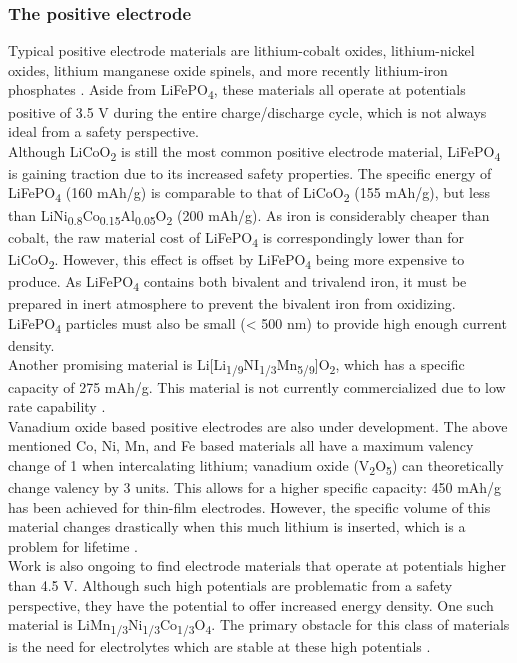\documentclass[12pt]{article} %
\begin{document}
\subsubsection{The positive electrode} %

Typical positive electrode materials are lithium-cobalt oxides, lithium-nickel oxides, lithium manganese oxide spinels, and more recently lithium-iron phosphates \cite{kulova_new_2013}.
Aside from LiFePO\textsubscript{4}, these materials all operate at potentials positive of 3.5 V during the entire charge/discharge cycle, which is not always ideal from a safety perspective.
\\
Although LiCoO\textsubscript{2} is still the most common positive electrode material, LiFePO\textsubscript{4} is gaining traction due to its increased safety properties.
The specific energy of LiFePO\textsubscript{4} (160 mAh/g) is comparable to that of LiCoO\textsubscript{2} (155 mAh/g), but less than LiNi\textsubscript{0.8}Co\textsubscript{0.15}Al\textsubscript{0.05}O\textsubscript{2} (200 mAh/g).
As iron is considerably cheaper than cobalt, the raw material cost of LiFePO\textsubscript{4} is correspondingly lower than for LiCoO\textsubscript{2}.
However, this effect is offset by LiFePO\textsubscript{4} being more expensive to produce.
As LiFePO\textsubscript{4} contains both bivalent and trivalend iron, it must be prepared in inert atmosphere to prevent the bivalent iron from oxidizing.
LiFePO\textsubscript{4} particles must also be small (< 500 nm) to provide high enough current density.
\\
Another promising material is Li[Li\textsubscript{1/9}NI\textsubscript{1/3}Mn\textsubscript{5/9}]O\textsubscript{2}, which has a specific capacity of 275 mAh/g.
This material is not currently commercialized due to low rate capability \cite{reddy_thomas_section_2011-1}.
\\
Vanadium oxide based positive electrodes are also under development.
The above mentioned Co, Ni, Mn, and Fe based materials all have a maximum valency change of 1 when intercalating lithium; vanadium oxide (V\textsubscript{2}O\textsubscript{5}) can theoretically change valency by 3 units.
This allows for a higher specific capacity: 450 mAh/g has been achieved for thin-film electrodes.
However, the specific volume of this material changes drastically when this much lithium is inserted, which is a problem for lifetime \cite{kulova_new_2013}.
\\
Work is also ongoing to find electrode materials that operate at potentials higher than 4.5 V.
Although such high potentials are problematic from a safety perspective, they have the potential to offer increased energy density.
One such material is LiMn\textsubscript{1/3}Ni\textsubscript{1/3}Co\textsubscript{1/3}O\textsubscript{4}.
The primary obstacle for this class of materials is the need for electrolytes which are stable at these high potentials \cite{kulova_new_2013}.
\end{document}
